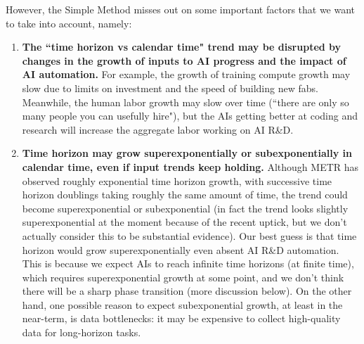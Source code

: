 \documentclass{article}
\theoremstyle{definition}
\begin{document}
However, the Simple Method misses out on some important factors that we want to take into account, namely:
\begin{enumerate}
\item \textbf{The ``time horizon vs calendar time" trend may be disrupted by changes in the growth of inputs to AI progress and the impact of AI automation.} For example, the growth of training compute growth may slow due to limits on investment and the speed of building new fabs. Meanwhile, the human labor growth may slow over time (``there are only so many people you can usefully hire"), but the AIs getting better at coding and research will increase the aggregate labor working on AI R\&D.
\item \textbf{Time horizon may grow superexponentially or subexponentially in calendar time, even if input trends keep holding.} Although METR has observed roughly exponential time horizon growth, with successive time horizon doublings taking roughly the same amount of time, the trend could become superexponential or subexponential (in fact the trend looks slightly superexponential at the moment because of the recent uptick, but we don't actually consider this to be substantial evidence). Our best guess is that time horizon would grow superexponentially even absent AI R\&D automation. This is because we expect AIs to reach infinite time horizons (at finite time), which requires superexponential growth at some point, and we don't think there will be a sharp phase transition (more discussion below). On the other hand, one possible reason to expect subexponential growth, at least in the near-term, is data bottlenecks: it may be expensive to collect high-quality data for long-horizon tasks.
\end{enumerate}
\end{document}
